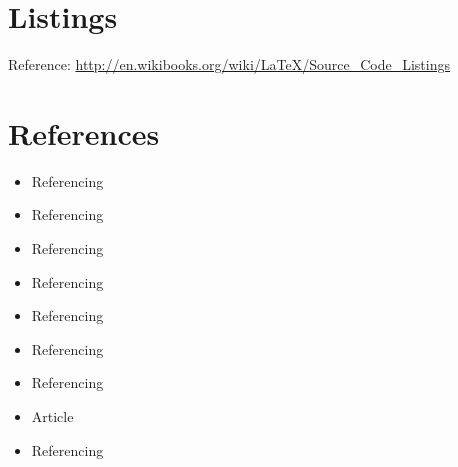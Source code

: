 \section{Listings}\label{sec:LABEL_CHP_2_SEC_D}
Reference: \url{http://en.wikibooks.org/wiki/LaTeX/Source_Code_Listings}



\section{References}\label{sec:LABEL_CHP_2_SEC_E}
\begin{itemize}
  \item Referencing 
  \item Referencing 
  \item Referencing 
  \item Referencing 
  \item Referencing 
  \item Referencing 
  \item Referencing 
  \item Article \cite{braida2015transforming}
  \item Referencing 
\end{itemize}
